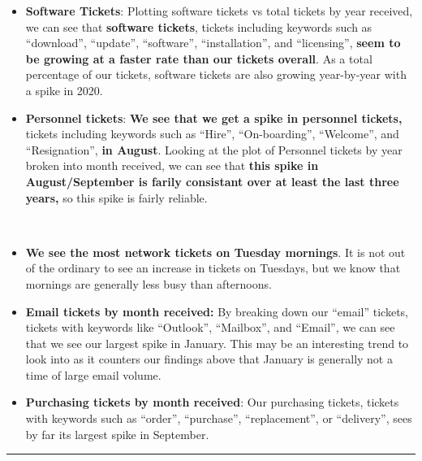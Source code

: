 \documentclass[11pt]{article}
\begin{document}
    \begin{itemize}
\item
  \textbf{Software Tickets}: Plotting software tickets vs total tickets
  by year received, we can see that \textbf{software tickets}, tickets
  including keywords such as ``download'', ``update'', ``software'',
  ``installation'', and ``licensing'', \textbf{seem to be growing at a
  faster rate than our tickets overall}. As a total percentage of our
  tickets, software tickets are also growing year-by-year with a spike
  in 2020.
\item
  \textbf{Personnel tickets}: \textbf{We see that we get a spike in
  personnel tickets,} tickets including keywords such as ``Hire'',
  ``On-boarding'', ``Welcome'', and ``Resignation'', \textbf{in August}.
  Looking at the plot of Personnel tickets by year broken into month
  received, we can see that \textbf{this spike in August/September is
  farily consistant over at least the last three years,} so this spike
  is fairly reliable.
\end{itemize}

    \begin{center}
    \end{center}
    { \hspace*{\fill} \\}
    
    \begin{itemize}
\item
  \textbf{We see the most network tickets on Tuesday mornings}. It is
  not out of the ordinary to see an increase in tickets on Tuesdays, but
  we know that mornings are generally less busy than afternoons.
\item
  \textbf{Email tickets by month received:} By breaking down our
  ``email'' tickets, tickets with keywords like ``Outlook'',
  ``Mailbox'', and ``Email'', we can see that we see our largest spike
  in January. This may be an interesting trend to look into as it
  counters our findings above that January is generally not a time of
  large email volume.
\item
  \textbf{Purchasing tickets by month received}: Our purchasing tickets,
  tickets with keywords such as ``order'', ``purchase'',
  ``replacement'', or ``delivery'', sees by far its largest spike in
  September.
\end{itemize}

    \begin{center}\rule{0.5\linewidth}{\linethickness}\end{center}
\end{document}
